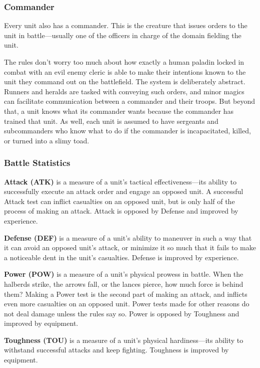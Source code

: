 \documentclass[10pt,a4paper,twoside,bg=print,twocolumn,openany,nodeprecatedcode]{dndbook}
\begin{document}
\subsubsection{Commander}
Every unit also has a commander. This is the creature that issues orders to the unit in battle—usually one of the officers in charge of the domain fielding the unit.

The rules don't worry too much about how exactly a human paladin locked in combat with an evil enemy cleric is able to make their intentions known to the unit they command out on the battlefield. The system is deliberately abstract. Runners and heralds are tasked with conveying such orders, and minor magics can facilitate communication between a commander and their troops. But beyond that, a unit knows what its commander wants because the commander has trained that unit. As well, each unit is assumed to have sergeants and subcommanders who know what to do if the commander is incapacitated, killed, or turned into a slimy toad.

\subsubsection{Battle Statistics}
 

\textbf{Attack (ATK)} is a measure of a unit's tactical effectiveness—its ability to successfully execute an attack order and engage an opposed unit. A successful Attack test can inflict casualties on an opposed unit, but is only half of the process of making an attack. Attack is opposed by Defense and improved by experience.

\textbf{Defense (DEF)} is a measure of a unit's ability to maneuver in such a way that it can avoid an opposed unit's attack, or minimize it so much that it fails to make a noticeable dent in the unit's casualties. Defense is improved by experience.

\textbf{Power (POW)} is a measure of a unit's physical prowess in battle. When the halberds strike, the arrows fall, or the lances pierce, how much force is behind them? Making a Power test is the second part of making an attack, and inflicts even more casualties on an opposed unit. Power tests made for other reasons do not deal damage unless the rules say so. Power is opposed by Toughness and improved by equipment.

\textbf{Toughness (TOU)} is a measure of a unit's physical hardiness—its ability to withstand successful attacks and keep fighting. Toughness is improved by equipment.
\end{document}
